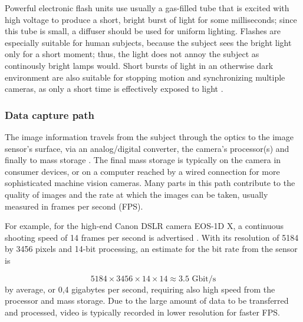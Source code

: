Powerful electronic flash units use usually a gas-filled tube that is excited with high voltage to produce a short, bright burst of light for some milliseconds;
since this tube is small, a diffuser should be used for uniform lighting.
Flashes are especially suitable for human subjects, because the subject sees the bright light only for a short moment; thus, the light does not annoy the subject as continously bright lamps would.
Short bursts of light in an otherwise dark environment are also suitable for stopping motion and synchronizing multiple cameras, as only a short time is effectively exposed to light \cite{langford2000basic}.


\subsubsection{Data capture path} %

The image information travels from the subject through the optics to the image sensor's surface, via an analog/digital converter, the camera's processor(s) and finally to mass storage \cite{szeliski10vision}.
The final mass storage is typically on the camera in consumer devices, or on a computer reached by a wired connection for more sophisticated machine vision cameras.
Many parts in this path contribute to the quality of images and the rate at which the images can be taken, usually measured in frames per second (FPS).



For example, for the high-end Canon DSLR camera EOS-1D X, a continuous shooting speed of 14 frames per second is advertised \cite{eos1dx}.
With its resolution of 5184 by 3456 pixels and 14-bit processing, an estimate for the bit rate from the sensor is

\begin{equation} \label{eq:eos1dspeed}
5184 \times 3456 \times 14 \times 14 \approx 3.5\text{ Gbit/s}
\end{equation}
by average, or 0,4 gigabytes per second, requiring also high speed from the processor and mass storage.
Due to the large amount of data to be transferred and processed, video is typically recorded in lower resolution for faster FPS.

